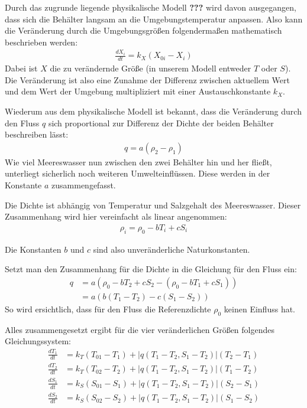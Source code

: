 \documentclass[a4paper,twoside]{article}
\begin{document}
	Durch das zugrunde liegende physikalische Modell \textbf{???} wird davon ausgegangen, dass sich die Behälter langsam an die Umgebungstemperatur anpassen. Also kann die Veränderung durch die Umgebungsgrößen folgendermaßen mathematisch beschrieben werden:
	\begin{align*}
		\frac{dX_i}{dt} = k_X \left( X_{0i} - X_i \right)
	\end{align*}
	Dabei ist \(X\) die zu verändernde Größe (in unserem Modell entweder \(T\) oder \(S\)).
	Die Veränderung ist also eine Zunahme der Differenz zwischen aktuellem Wert und dem Wert der Umgebung multipliziert mit einer Austauschkonstante \(k_X\).
	
	Wiederum aus dem physikalische Modell ist bekannt, dass die Veränderung durch den Fluss \(q\) sich proportional zur Differenz der Dichte der beiden Behälter beschreiben lässt:
	\begin{align*}
		q = a \left( \rho_2 - \rho_1 \right)
	\end{align*}
	Wie viel Meereswasser nun zwischen den zwei Behälter hin und her fließt, unterliegt sicherlich noch weiteren Umwelteinflüssen. Diese werden in der Konstante \(a\) zusammengefasst.
	
	Die Dichte ist abhängig von Temperatur und Salzgehalt des Meereswasser. Dieser Zusammenhang wird hier vereinfacht als linear angenommen:
	\begin{align*}
		\rho_i = \rho_0 - bT_i + cS_i
	\end{align*}
	
	Die Konstanten \(b\) und \(c\) sind also unveränderliche Naturkonstanten.
	
	Setzt man den Zusammenhang für die Dichte in die Gleichung für den Fluss ein:
	\begin{align*}
		q &= a \left( \rho_0 - bT_2 + cS_2 - \left( \rho_0 - bT_1 + cS_1 \right) \right) \\
		&= a \left( b\left( T_1 - T_2 \right) - c \left( S_1 - S_2 \right) \right)
	\end{align*}
	So wird ersichtlich, dass für den Fluss die Referenzdichte \(\rho_0\) keinen Einfluss hat.
	
	Alles zusammengesetzt ergibt für die vier veränderlichen Größen folgendes Gleichungssystem:
	\begin{align*}
		\frac{dT_1}{dt} &= k_T\left(T_{01} - T_1\right) + \left|q(T_1 - T_2,S_1 - T_2)\right|\left(T_2 - T_1\right) \\
		\frac{dT_2}{dt} &= k_T\left(T_{02} - T_2\right) + \left|q(T_1 - T_2,S_1 - T_2)\right|\left(T_1 - T_2\right) \\
		\frac{dS_1}{dt} &= k_S\left(S_{01} - S_1\right) + \left|q(T_1 - T_2,S_1 - T_2)\right|\left(S_2 - S_1\right) \\
		\frac{dS_2}{dt} &= k_S\left(S_{02} - S_2\right) + \left|q(T_1 - T_2,S_1 - T_2)\right|\left(S_1 - S_2\right)
	\end{align*}
	 
\end{document}
